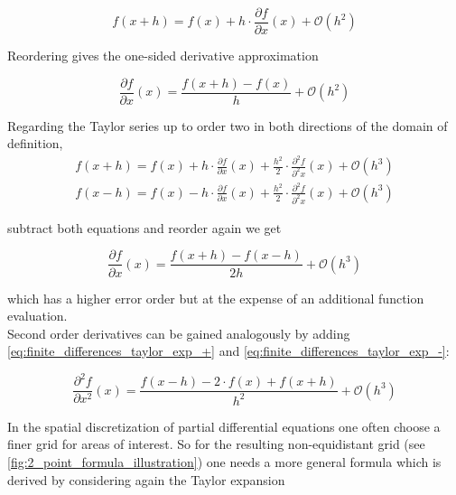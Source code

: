 \documentclass{scrartcl}[12pt, halfparskip]
\numberwithin{equation}{section}
\numberwithin{figure}{section}
\numberwithin{table}{section}
\begin{document}
\begin{equation}
f(x+h) = f(x) + h \cdot \frac{\partial f}{\partial x}(x) + \mathcal{O}(h^2)
\end{equation}

Reordering gives the one-sided derivative approximation

\begin{equation}
\frac{\partial f}{\partial x}(x) = \frac{f(x+h) - f(x)}{h} + \mathcal{O}(h^2)
\label{eq:one_sided_discretized_derivative}
\end{equation}

Regarding the Taylor series up to order two in both directions of the domain of definition,
\begin{subequations}
	\label{eq:finite_differences_taylor_exp}
	\begin{align}
	f(x+h) = f(x) + h \cdot \frac{\partial f}{\partial x}(x) + \frac{h^2}{2} \cdot \frac{\partial^2 f}{\partial^2 x}(x) + \mathcal{O}(h^3) \label{eq:finite_differences_taylor_exp_+} \\
	f(x-h) = f(x) - h \cdot \frac{\partial f}{\partial x}(x) + \frac{h^2}{2} \cdot \frac{\partial^2 f}{\partial^2 x}(x) + \mathcal{O}(h^3)  \label{eq:finite_differences_taylor_exp_-}	
	\end{align}
\end{subequations}


subtract both equations and reorder again we get

\begin{equation}
\frac{\partial f}{\partial x}(x) = \frac{f(x+h) - f(x-h)}{2 h} + \mathcal{O}(h^3)
\end{equation}

which has a higher error order but at the expense of an additional function evaluation. \\

Second order derivatives can be gained analogously by adding \cref{eq:finite_differences_taylor_exp_+} and \cref{eq:finite_differences_taylor_exp_-}:

\begin{equation}
\frac{\partial^2 f}{\partial x^2}(x) = \frac{f(x-h) - 2 \cdot f(x) + f(x+h)}{h^2} + \mathcal{O}(h^3)
\label{eq:finite_difference_2nd_der}
\end{equation}

In the spatial discretization of partial differential equations one often choose a finer grid for areas of interest. So for the resulting non-equidistant grid (see \cref{fig:2_point_formula_illustration}) one needs a more general formula which is derived by considering again the Taylor expansion
\end{document}

